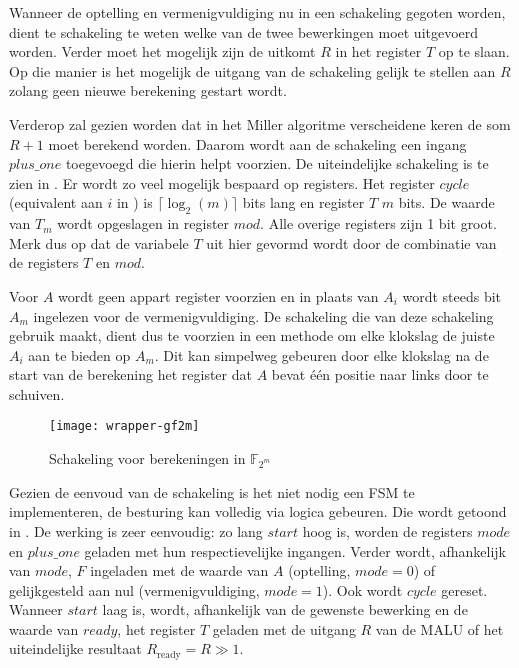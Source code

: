 Wanneer de optelling en vermenigvuldiging nu in een schakeling gegoten worden, dient te schakeling te weten welke van de twee bewerkingen moet uitgevoerd worden. Verder moet het mogelijk zijn de uitkomt $R$ in het register $T$ op te slaan. Op die manier is het mogelijk de uitgang van de schakeling gelijk te stellen aan $R$ zolang geen nieuwe berekening gestart wordt.  

Verderop zal gezien worden dat in het Miller algoritme verscheidene keren de som $R + 1$ moet berekend worden. Daarom wordt aan de schakeling een ingang $plus\_one$ toegevoegd die hierin helpt voorzien. De uiteindelijke schakeling is te zien in . Er wordt zo veel mogelijk bespaard op registers. Het register $cycle$ (equivalent aan $i$ in ) is $\lceil \log _2 (m) \rceil$ bits lang en register $T$ $m$ bits. De waarde van $T_m$ wordt opgeslagen in register $mod$. Alle overige registers zijn 1 bit groot. Merk dus op dat de variabele $T$ uit  hier gevormd wordt door de combinatie van de registers $T$ en $mod$. 

Voor $A$ wordt geen appart register voorzien en in plaats van $A_i$ wordt steeds bit $A_m$ ingelezen voor de vermenigvuldiging. De schakeling die van deze schakeling gebruik maakt, dient dus te voorzien in een methode om elke klokslag de juiste $A_i$ aan te bieden op $A_m$. Dit kan simpelweg gebeuren door elke klokslag na de start van de berekening het register dat $A$ bevat \'e\'en positie naar links door te schuiven.

\begin{figure}[h]
	\centering
		\texttt{[image: wrapper-gf2m]}
		\caption{Schakeling voor berekeningen in $\mathbb{F}_{2^m}$\label{figuur-implementatie-wrapper-gf2m}}
\end{figure}

Gezien de eenvoud van de schakeling is het niet nodig een FSM te implementeren, de besturing kan volledig via logica gebeuren. Die wordt getoond in . De werking is zeer eenvoudig: zo lang $start$ hoog is, worden de registers $mode$ en $plus\_one$ geladen met hun respectievelijke ingangen. Verder wordt, afhankelijk van $mode$, $F$ ingeladen met de waarde van $A$ (optelling, $mode = 0$) of gelijkgesteld aan nul (vermenigvuldiging, $mode = 1$). Ook wordt $cycle$ gereset. Wanneer $start$ laag is, wordt, afhankelijk van de gewenste bewerking en de waarde van $ready$, het register $T$ geladen met de uitgang $R$ van de MALU of het uiteindelijke resultaat $R_{\text{ready}} = R \gg 1$.


